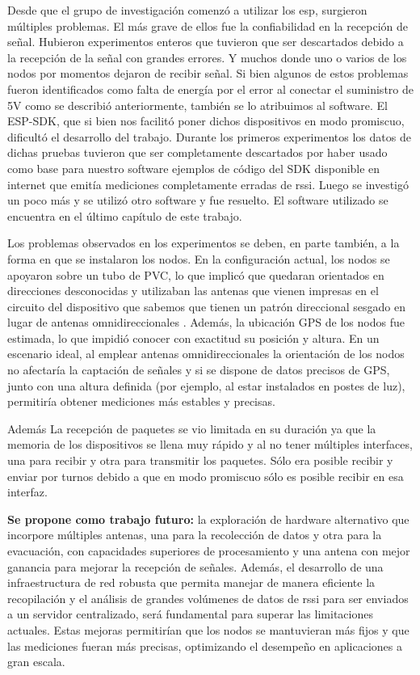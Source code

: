 Desde que el grupo de investigación comenzó a utilizar los \acs{esp}, surgieron múltiples problemas. El más grave de ellos fue la confiabilidad en la recepción de señal. Hubieron experimentos enteros que tuvieron que ser descartados debido a la recepción de la señal con grandes errores. Y muchos donde uno o varios de los nodos por momentos dejaron de recibir señal. Si bien algunos de estos problemas fueron identificados como falta de energía por el error al conectar el suministro de 5V como se describió anteriormente, también se lo atribuimos al software. El ESP-SDK, que si bien nos facilitó poner dichos dispositivos en modo promiscuo, dificultó el desarrollo del trabajo. Durante los primeros experimentos los datos de dichas pruebas tuvieron que ser completamente descartados por haber usado como base para nuestro software ejemplos de código del SDK disponible en internet que emitía mediciones completamente erradas de \acs{rssi}. Luego se investigó un poco más y se utilizó otro software y fue resuelto. El software utilizado se encuentra en el último capítulo de este trabajo.

Los problemas observados en los experimentos se deben, en parte también, a la forma en que se instalaron los nodos. En la configuración actual, los nodos se apoyaron sobre un tubo de PVC, lo que implicó que quedaran orientados en direcciones desconocidas y utilizaban las antenas que vienen impresas en el circuito del dispositivo que sabemos que tienen un patrón direccional sesgado en lugar de antenas omnidireccionales \cite{Yoppy2018RSSICO}. Además, la ubicación GPS de los nodos fue estimada, lo que impidió conocer con exactitud su posición y altura. En un escenario ideal, al emplear antenas omnidireccionales la orientación de los nodos no afectaría la captación de señales y si se dispone 
de datos precisos de GPS, junto con una altura definida (por ejemplo, al estar instalados en postes de luz), permitiría obtener mediciones más estables y precisas.

Además La recepción de paquetes se vio limitada en su duración ya que la memoria de los dispositivos se llena muy rápido y al no tener múltiples interfaces, una para recibir y otra para transmitir los paquetes. Sólo era posible recibir y enviar por turnos debido a que en modo promiscuo sólo es posible recibir en esa interfaz.

\textbf{Se propone como trabajo futuro:} la exploración de hardware alternativo que incorpore múltiples antenas, una para la recolección de datos y otra para la evacuación, con capacidades superiores de procesamiento y una antena con mejor ganancia para mejorar la recepción de señales. Además, el desarrollo de una infraestructura de red robusta que permita manejar de manera eficiente la recopilación y el análisis de grandes volúmenes de datos de \acs{rssi} para ser enviados a un servidor centralizado, será fundamental para superar las limitaciones actuales. Estas mejoras permitirían que los nodos se mantuvieran más fijos y que las mediciones fueran más precisas, optimizando el desempeño en aplicaciones a gran escala.

